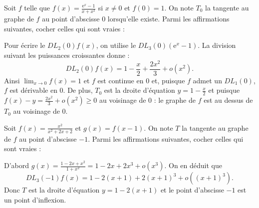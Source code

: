\begin{question}
Soit $f$ telle que $\displaystyle f(x)=\frac{\mathrm{e}^{x}-1}{x+x^2}$ si $x\neq 0$ et $f(0)=1$. On note $T_0$ la tangente au graphe de $f$ au point d'abscisse $0$ lorsqu'elle existe. Parmi les affirmations suivantes, cocher celles qui sont vraies :
\begin{answers}  
\end{answers}
\begin{explanations}
Pour écrire le $DL_2(0)f(x)$, on utilise le $DL_3(0)(\mathrm{e}^{x}-1)$. La division suivant les puissances croissantes donne :
$$\displaystyle DL_2(0)f(x)=1-\frac{x}{2}+\frac{2x^2}{3}+o(x^2).$$
Ainsi $\displaystyle \lim _{x\to 0}f(x)=1$ et $f$ est continue en $0$ et, puisque $f$ admet un $DL_1(0)$, $f$ est dérivable en $0$. De plus, $T_0$ est la droite d'équation $\displaystyle y=1-\frac{x}{2}$ et puisque $\displaystyle f(x)-y=\frac{2x^2}{3}+o(x^2)\geq 0$ au voisinage de $0$ : le graphe de $f$ est au dessus de $T_0$ au voisinage de $0$.
\end{explanations}
\end{question}

\begin{question}
Soit $\displaystyle f(x)=\frac{x^2}{x^2+2x+2}$ et $g(x)=f(x-1)$. On note $T$ la tangente au graphe de $f$ au point d'abscisse $-1$. Parmi les affirmations suivantes, cocher celles qui sont vraies :
\begin{answers}  
\end{answers}
\begin{explanations}
D'abord $\displaystyle g(x)=\frac{1-2x+x^2}{1+x^2}=1-2x+2x^3+o(x^3)$. On en déduit que
$$\displaystyle DL_3(-1)f(x)=1-2(x+1)+2(x+1)^3+o\left((x+1)^3\right).$$
Donc $T$ est la droite d'équation $y=1-2(x+1)$ et le point d'abscisse $-1$ est un point d'inflexion.
\end{explanations}
\end{question}

